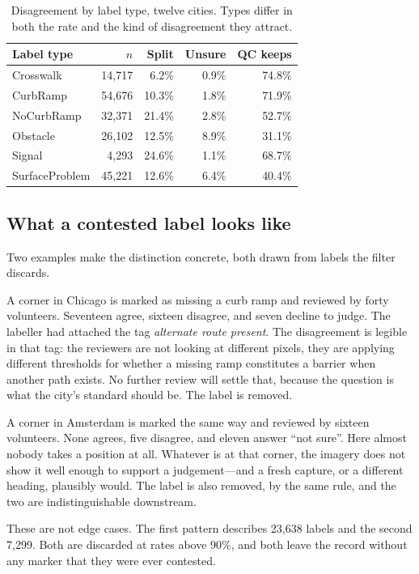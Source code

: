 \documentclass[sigconf]{acmart}
\begin{document}
\begin{table}[t]
\caption{Disagreement by label type, twelve cities. Types differ in both the
rate and the kind of disagreement they attract.}
\label{tab:types}
\begin{tabular}{lrrrr}
\toprule
\textbf{Label type} & \textbf{$n$} & \textbf{Split} & \textbf{Unsure} & \textbf{QC keeps} \\
\midrule
Crosswalk       & 14{,}717 &  6.2\% & 0.9\% & 74.8\% \\
CurbRamp        & 54{,}676 & 10.3\% & 1.8\% & 71.9\% \\
NoCurbRamp      & 32{,}371 & 21.4\% & 2.8\% & 52.7\% \\
Obstacle        & 26{,}102 & 12.5\% & 8.9\% & 31.1\% \\
Signal          &  4{,}293 & 24.6\% & 1.1\% & 68.7\% \\
SurfaceProblem  & 45{,}221 & 12.6\% & 6.4\% & 40.4\% \\
\bottomrule
\end{tabular}
\end{table}

\subsection{What a contested label looks like}

Two examples make the distinction concrete, both drawn from labels the filter
discards.

A corner in Chicago is marked as missing a curb ramp and reviewed by forty
volunteers. Seventeen agree, sixteen disagree, and seven decline to judge. The
labeller had attached the tag \emph{alternate route present}. The disagreement
is legible in that tag: the reviewers are not looking at different pixels, they
are applying different thresholds for whether a missing ramp constitutes a
barrier when another path exists. No further review will settle that, because
the question is what the city's standard should be. The label is removed.

A corner in Amsterdam is marked the same way and reviewed by sixteen
volunteers. None agrees, five disagree, and eleven answer ``not sure''. Here
almost nobody takes a position at all. Whatever is at that corner, the imagery
does not show it well enough to support a judgement---and a fresh capture, or a
different heading, plausibly would. The label is also removed, by the same
rule, and the two are indistinguishable downstream.

These are not edge cases. The first pattern describes 23{,}638 labels and the
second 7{,}299. Both are discarded at rates above 90\%, and both leave the
record without any marker that they were ever contested.
\end{document}
